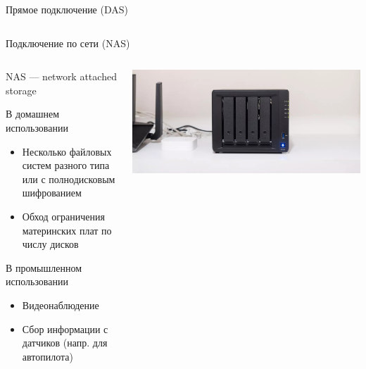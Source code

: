\documentclass[aspectratio=169]{beamer}
\begin{document}
\begin{frame}{Прямое подключение (DAS)}
\begin{columns}[T]
\begin{column}{.4\textwidth}
    \end{column}
\end{columns}
\end{frame}

\begin{frame}{Подключение по сети (NAS)}
\begin{columns}[T]
    \begin{column}{.4\textwidth}
        NAS --- network attached storage

        В домашнем использовании
        \begin{itemize}
            \item Несколько файловых систем разного типа или с полнодисковым шифрованием
            \item Обход ограничения материнских плат по числу дисков
        \end{itemize}

        В промышленном использовании
        \begin{itemize}
            \item Видеонаблюдение
            \item Сбор информации с датчиков (напр. для автопилота)
        \end{itemize}
    \end{column}
    \hfill
    \begin{column}{.55\textwidth}
        \centering
        \nas
        \vspace{0.7em}
        \includegraphics[scale = 0.15]{fig/5.nas.jpg}
    \end{column}
\end{columns}
\end{frame}
\end{document}
